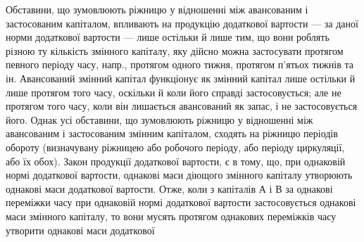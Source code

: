 Обставини, що зумовлюють ріжницю у відношенні між авансованим і
застосованим капіталом, впливають на продукцію додаткової вартости —
за даної норми додаткової вартости — лише остільки й лише тим, що
вони роблять різною ту кількість змінного капіталу, яку дійсно можна
застосувати протягом певного періоду часу, напр., протягом одного тижня,
протягом п’ятьох тижнів та ін. Авансований змінний капітал функціонує
як змінний капітал лише остільки й лише протягом того часу, оскільки й
коли його справді застосовується; але не протягом того часу, коли він
лишається авансований як запас, і не застосовується його. Однак усі
обставини, що зумовлюють ріжницю у відношенні між авансованим і застосованим
змінним капіталом, сходять на ріжницю періодів обороту
(визначувану ріжницею або робочого періоду, або періоду циркуляції,
або їх обох). Закон продукції додаткової вартости, є в тому, що, при однаковій
нормі додаткової вартости, однакові маси діющого змінного капіталу
утворюють однакові маси додаткової вартости. Отже, коли з капіталів
$А$ і $В$ за однакові переміжки часу при однаковій нормі додаткової
вартости застосовується однакові маси змінного капіталу, то вони мусять
протягом однакових переміжків часу утворити однакові маси додаткової
\parbreak{}  %
